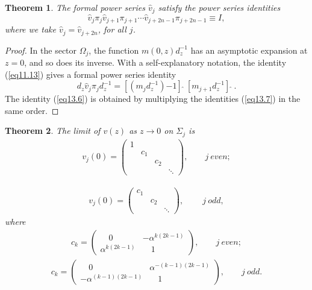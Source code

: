 \documentclass{surv-l}
\theoremstyle{plain}
\newtheorem{theorem}{Theorem}[section]
\theoremstyle{definition}
\numberwithin{equation}{chapter}
\begin{document}
\begin{theorem}\label{thm13.5}
The formal power series $\hat{v}_{j}$ satisfy the power series identities
\setcounter{equation}{5}
\begin{equation}\label{eq13.6}
\hat{v}_{j}\pi_{j}\hat{v}_{j+1}\pi_{j+1}\cdots\hat{v}_{j+2n-1}\pi_{j+2n-1}\equiv I,
\end{equation}
where we take $\hat{v}_{j}=\hat{v}_{j+2n}$, for all $j$.
\end{theorem}
\begin{proof}
 In the sector $\Omega_{j}$, the function $m(0, z)d_{z}^{-1}$ has an asymptotic expansion at $z=0$, and so does its inverse. With a self-explanatory notation, the identity (\ref{eq11.13}) gives a formal power series identity
\begin{equation}\label{eq13.7}
d_{z}\hat{v}_{j}\pi_{j}d_{z}^{-1}=[(m_{j}d_{z}^{-1}){-1}]\ \widehat{}\ [m_{j+1}d_{z}^{-1}]\ \widehat{}\ .
\end{equation}
The identity (\ref{eq13.6}) is obtained by multiplying the identities (\ref{eq13.7}) in the same order.
\end{proof}
\setcounter{theorem}{7}
\begin{theorem}\label{thm13.8}
The limit of $v(z)$ as $z\rightarrow 0$ on $\Sigma_{j}$ is
\setcounter{equation}{8}
\begin{align}\label{eq13.9}
v_{j}(0)=\left(\begin{array}{cccc}
  1 &  &  &  \\
   & c_{1} &  &  \\
   &  & c_{2} &  \\
   &  &  & \ddots
\end{array}\right),\qquad j\ even;
\end{align}

\begin{align}\label{eq13.10}
v_{j}(0)=\left(\begin{array}{ccc}
  c_{1} &  &  \\
   & c_{2} &  \\
   &  & \ddots
\end{array}\right),\qquad\ j\ odd,
\end{align}
where
\begin{align}\label{eq13.11}
c_{k}=\left(\begin{array}{cc}
{\quad 0} & -\alpha^{k(2k-1)}\\
\alpha^{k(2k-1)} & {\quad 1}
\end{array}\right),\qquad j\ even;
\end{align}
\begin{align}\label{eq13.12}
c_{k}=\left(\begin{array}{cc}
{\quad 0} & \alpha^{-(k-1)(2k-1)}\\
-\alpha^{(k-1)(2k-1)} & {\quad 1}
\end{array}\right),\qquad j\ odd.
\end{align}
\end{theorem}
\end{document}
